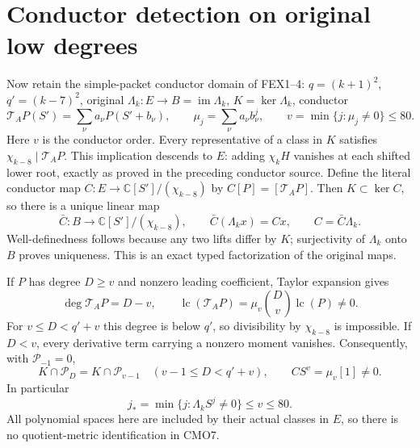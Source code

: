 \documentclass[11pt]{article}
\newcommand{\C}{\mathbb C}
\newcommand{\im}{\operatorname{im}}
\newcommand{\lc}{\operatorname{lc}}
\begin{document}
\section{Conductor detection on original low degrees}
Now retain the simple-packet conductor domain of FEX1--4:
$q=(k+1)^2$, $q'=(k-7)^2$, original $\Lambda_k:E\to B=\im\Lambda_k$,
$K=\ker\Lambda_k$, conductor
\[
 \mathcal T_AP(S')=\sum_{\nu}a_\nu P(S'+b_\nu),\qquad
 \mu_j=\sum_\nu a_\nu b_\nu^j,\qquad
 v=\min\{j:\mu_j\ne0\}\le80 .
\]
Here $v$ is the conductor order. Every representative of a class
in $K$ satisfies $\chi_{k-8}\mid\mathcal T_AP$.
This implication descends to $E$: adding $\chi_kH$ vanishes
at each shifted lower root, exactly as proved in the preceding
conductor source.
Define the literal conductor map
$C:E\to\C[S']/(\chi_{k-8})$ by $C[P]=[\mathcal T_AP]$.
Then $K\subset\ker C$, so there is a unique linear map
\begin{equation}\tag{CMO6}
 \bar C:B\longrightarrow\C[S']/(\chi_{k-8}),\qquad
 \bar C(\Lambda_kx)=Cx,\qquad C=\bar C\Lambda_k .
\end{equation}
Well-definedness follows because any two lifts differ by $K$;
surjectivity of $\Lambda_k$ onto $B$ proves uniqueness.
This is an exact typed factorization of the original maps.

If $P$ has degree $D\ge v$ and nonzero leading coefficient,
Taylor expansion gives
\[
 \deg\mathcal T_AP=D-v,\qquad
 \lc(\mathcal T_AP)=\mu_v\binom Dv\lc(P)\ne0 .
\]
For $v\le D<q'+v$ this degree is below $q'$, so
divisibility by $\chi_{k-8}$ is impossible.
If $D<v$, every derivative term carrying a nonzero moment
vanishes. Consequently, with $\mathcal P_{-1}=0$,
\begin{equation}\tag{CMO7}
 K\cap\mathcal P_D=K\cap\mathcal P_{v-1}
 \quad(v-1\le D<q'+v),\qquad
 CS^v=\mu_v[1]\ne0 .
\end{equation}
In particular
\begin{equation}\tag{CMO8}
 j_*=\min\{j:\Lambda_k S^j\ne0\}\le v\le80 .
\end{equation}
All polynomial spaces here are included by their actual classes
in $E$, so there is no quotient-metric identification in CMO7.
\end{document}
